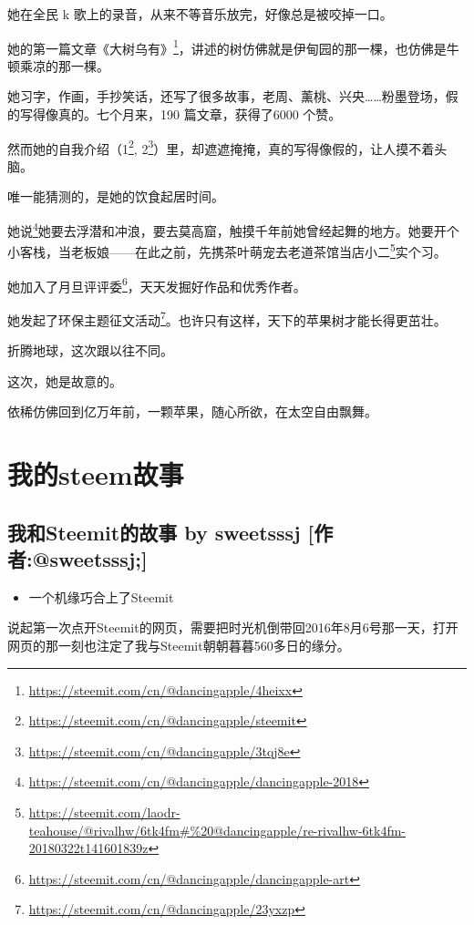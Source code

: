 \documentclass[]{ctexbook}
\providecommand{\tightlist}{%
  \setlength{\itemsep}{0pt}\setlength{\parskip}{0pt}}
\renewcommand{\href}[2]{#2\footnote{\url{#1}}}
\begin{document}
她在全民 k 歌上的录音，从来不等音乐放完，好像总是被咬掉一口。

她的第一篇文章\href{https://steemit.com/cn/@dancingapple/4heixx}{《大树乌有》}，讲述的树仿佛就是伊甸园的那一棵，也仿佛是牛顿乘凉的那一棵。

她习字，作画，手抄笑话，还写了很多故事，老周、薰桃、兴央\ldots{}\ldots{}粉墨登场，假的写得像真的。七个月来，190 篇文章，获得了6000 个赞。

然而她的自我介绍（\href{https://steemit.com/cn/@dancingapple/steemit}{1}, \href{https://steemit.com/cn/@dancingapple/3tqj8e}{2}）里，却遮遮掩掩，真的写得像假的，让人摸不着头脑。

唯一能猜测的，是她的饮食起居时间。

\href{https://steemit.com/cn/@dancingapple/dancingapple-2018}{她说}她要去浮潜和冲浪，要去莫高窟，触摸千年前她曾经起舞的地方。她要开个小客栈，当老板娘------在此之前，先携茶叶萌宠\href{https://steemit.com/laodr-teahouse/@rivalhw/6tk4fm\#\%20@dancingapple/re-rivalhw-6tk4fm-20180322t141601839z}{去老道茶馆当店小二}实个习。

她加入了\href{https://steemit.com/cn/@dancingapple/dancingapple-art}{月旦评评委}，天天发掘好作品和优秀作者。

她发起了\href{https://steemit.com/cn/@dancingapple/23yxzp}{环保主题征文活动}。也许只有这样，天下的苹果树才能长得更茁壮。

折腾地球，这次跟以往不同。

这次，她是故意的。

依稀仿佛回到亿万年前，一颗苹果，随心所欲，在太空自由飘舞。

\hypertarget{steem}{%
\section{我的steem故事}\label{steem}}

\hypertarget{steemit-by-sweetsssj-sweetsssj}{%
\subsection{我和Steemit的故事 by sweetsssj {[}作者:@sweetsssj;{]}}\label{steemit-by-sweetsssj-sweetsssj}}

\begin{itemize}
\tightlist
\item
  一个机缘巧合上了Steemit
\end{itemize}

说起第一次点开Steemit的网页，需要把时光机倒带回2016年8月6号那一天，打开网页的那一刻也注定了我与Steemit朝朝暮暮560多日的缘分。
\end{document}
